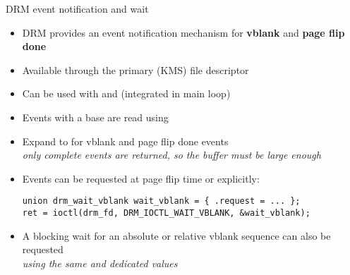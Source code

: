 \begin{frame}[fragile]{DRM event notification and wait}
  \begin{itemize}
  \item DRM provides an event notification mechanism for \textbf{vblank} and \textbf{page flip done}
  \item Available through the primary (KMS) file descriptor
  \item Can be used with  and  (integrated in main loop)
  \item Events with a  base are read using 
  \item Expand to  for vblank and page flip done events\\
    \textit{only complete events are returned, so the buffer must be large enough}
  \item Events can be requested at page flip time or explicitly:
  \begin{verbatim}
union drm_wait_vblank wait_vblank = { .request = ... };
ret = ioctl(drm_fd, DRM_IOCTL_WAIT_VBLANK, &wait_vblank);
  \end{verbatim}
  \item A blocking wait for an absolute or relative vblank sequence can also be requested\\
  \textit{using the same  and dedicated  values}
  \end{itemize}
\end{frame}

